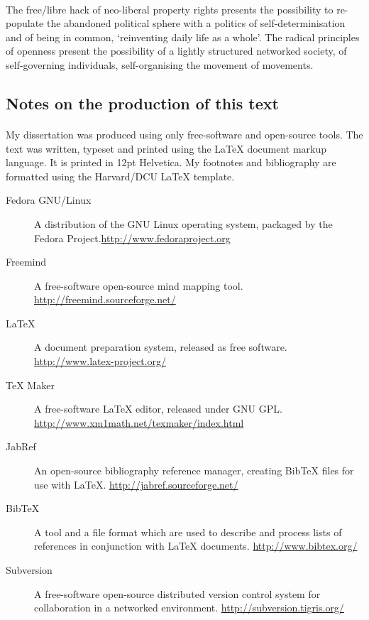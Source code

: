 \documentclass[11pt,titlepage]{book}
\begin{document}
\paragraph{}The free/libre hack of neo-liberal property rights presents the possibility to re-populate the abandoned political sphere with a politics of self-determinisation and of being in common, `reinventing daily life as a whole'. The radical principles of openness present the possibility of a lightly structured networked society, of self-governing individuals, self-organising the movement of movements.\newpage
\singlespacing
\cleardoublepage
{}

\begin{appendices}
\section{Notes on the production of this text}
\paragraph{}My dissertation was produced using only free-software and open-source tools. The text was written, typeset and printed using the LaTeX document markup language. It is printed in 12pt Helvetica. My footnotes and bibliography are formatted using the Harvard/DCU LaTeX template.
\begin{description}
\item[Fedora GNU/Linux]{A distribution of the GNU Linux operating system, packaged by the Fedora Project.\newline\url{http://www.fedoraproject.org}}
\item[Freemind]{A free-software open-source mind mapping tool. \newline\url{http://freemind.sourceforge.net/}}
\item[LaTeX]{A document preparation system, released as free software. \newline\url{http://www.latex-project.org/}}
\item[TeX Maker]{A free-software LaTeX editor, released under GNU GPL. \newline\url{http://www.xm1math.net/texmaker/index.html}}
\item[JabRef]{An open-source bibliography reference manager, creating BibTeX files for use with LaTeX. \newline\url{http://jabref.sourceforge.net/}}
\item[BibTeX]{A tool and a file format which are used to describe and process lists of references in conjunction with LaTeX documents. \newline\url{http://www.bibtex.org/}}
\item[Subversion]{A free-software open-source distributed version control system for collaboration in a networked environment. \newline\url{http://subversion.tigris.org/}}
\end{description}
\newpage

\end{appendices}
\end{document}
